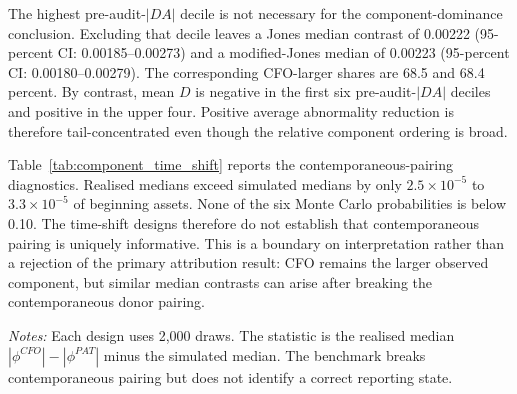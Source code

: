 The highest pre-audit-$|DA|$ decile is not necessary for the component-dominance conclusion. Excluding that decile leaves a Jones median contrast of 0.00222 (95-percent CI: 0.00185--0.00273) and a modified-Jones median of 0.00223 (95-percent CI: 0.00180--0.00279). The corresponding CFO-larger shares are 68.5 and 68.4 percent. By contrast, mean $D$ is negative in the first six pre-audit-$|DA|$ deciles and positive in the upper four. Positive average abnormality reduction is therefore tail-concentrated even though the relative component ordering is broad.

Table~\ref{tab:component_time_shift} reports the contemporaneous-pairing diagnostics. Realised medians exceed simulated medians by only $2.5\times10^{-5}$ to $3.3\times10^{-5}$ of beginning assets. None of the six Monte Carlo probabilities is below 0.10. The time-shift designs therefore do not establish that contemporaneous pairing is uniquely informative. This is a boundary on interpretation rather than a rejection of the primary attribution result: CFO remains the larger observed component, but similar median contrasts can arise after breaking the contemporaneous donor pairing.

\begin{table}[htbp]
\centering
\caption{Median time-shift diagnostics for RQ1}
\label{tab:component_time_shift}
\scriptsize
{}
\begin{minipage}{0.97\textwidth}\footnotesize
\textit{Notes:} Each design uses 2,000 draws. The statistic is the realised median $|\phi^{CFO}|-|\phi^{PAT}|$ minus the simulated median. The benchmark breaks contemporaneous pairing but does not identify a correct reporting state.
\end{minipage}
\end{table}
